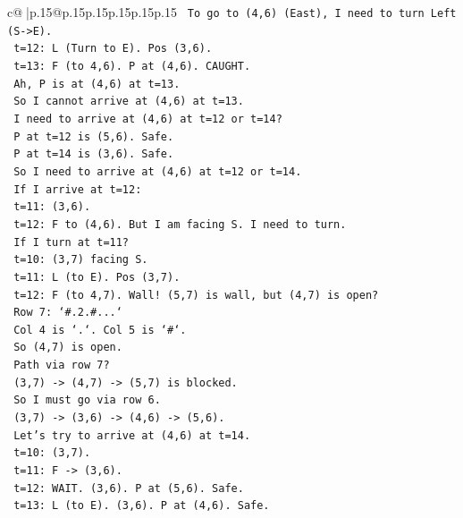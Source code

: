 \documentclass{article}
\begin{document}
{\begin{supertabular}{c@{$\;$}|p{.15\linewidth}@{}p{.15\linewidth}p{.15\linewidth}p{.15\linewidth}p{.15\linewidth}p{.15\linewidth}}
{{{\texttt{          To go to (4,6) (East), I need to turn Left (S{-}>E).} \\
\texttt{          t=12: L (Turn to E). Pos (3,6).} \\
\texttt{          t=13: F (to 4,6). P at (4,6). CAUGHT.} \\
\texttt{          Ah, P is at (4,6) at t=13.} \\
\texttt{          So I cannot arrive at (4,6) at t=13.} \\
\texttt{          I need to arrive at (4,6) at t=12 or t=14?} \\
\texttt{          P at t=12 is (5,6). Safe.} \\
\texttt{          P at t=14 is (3,6). Safe.} \\
\texttt{          So I need to arrive at (4,6) at t=12 or t=14.} \\
\texttt{          If I arrive at t=12:} \\
\texttt{          t=11: (3,6).} \\
\texttt{          t=12: F to (4,6). But I am facing S. I need to turn.} \\
\texttt{          If I turn at t=11?} \\
\texttt{          t=10: (3,7) facing S.} \\
\texttt{          t=11: L (to E). Pos (3,7).} \\
\texttt{          t=12: F (to 4,7). Wall! (5,7) is wall, but (4,7) is open?} \\
\texttt{          Row 7: `\#.2.\#...`} \\
\texttt{          Col 4 is `.`. Col 5 is `\#`.} \\
\texttt{          So (4,7) is open.} \\
\texttt{          Path via row 7?} \\
\texttt{          (3,7) {-}> (4,7) {-}> (5,7) is blocked.} \\
\texttt{          So I must go via row 6.} \\
\texttt{          (3,7) {-}> (3,6) {-}> (4,6) {-}> (5,6).} \\
\texttt{          Let's try to arrive at (4,6) at t=14.} \\
\texttt{          t=10: (3,7).} \\
\texttt{          t=11: F {-}> (3,6).} \\
\texttt{          t=12: WAIT. (3,6). P at (5,6). Safe.} \\
\texttt{          t=13: L (to E). (3,6). P at (4,6). Safe.} \\
}}}
\end{supertabular}}
\end{document}
